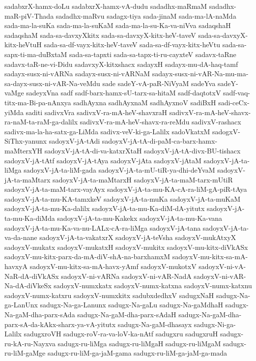 {sadabxrX-hamx-doLu
sadabxrX-hamx-vA-dudu
sadadhx-maRmaM
sadadhx-maR-piV-Thada
sadadhx-maRvu
sadagx-tiya
sada-jinaM
sada-ma-lA-naMda
sada-ma-la-suKa
sada-ma-la-suKaM
sada-ma-la-su-Ka-va-niVva
sadaqshaH
sadaqshaM
sada-sa-davxyXkitx
sada-sa-davxyX-kitx-heV-taveV
sada-sa-davxyX-kitx-heVtuH
sada-sa-df-vayx-kitx-heV-taveV
sada-sa-df-vayx-kitx-heVtu
sada-sa-sapx-ti-ma-duBxtaM
sada-sa-tapxti
sada-sa-tapx-ti-ru-cayxteV
sadavx-taRne
sadavx-taR-ne-vi-Didu
sadavxyX-kitxshacx
sadayxH
sadayx-mu-dA-haq-tamf
sadayx-susx-ni-vARNa
sadayx-susx-ni-vARNaM
sadayx-susx-ni-vAR-Na-mu-ma-sa-dayx-susx-ni-vAR-Na-veMdu
sade
sadeY-vA-paR-NiVyaM
sadeYva
sadeY-vaMge
sadeyxVna
sadf
sadf-barx-hamx-sU-tarx-sa-hitaM
sadf-daqtotxV
sadf-vaq-titx-ma-Bi-pa-nAnxya
sadhAyxna
sadhAyxnaM
sadhAyxnoV
sadiBxH
sadi-ceCx-yiMda
saditi
sadivxVra
sadivxV-ra-mA-heV-shavxraH
sadivxV-ra-mA-heV-shavx-ra-naM-ta-raM-ga-dalilx
sadivxV-ra-mA-heV-shavx-ra-reMdu
sadivxV-rashacx
sadivx-ma-la-ha-satx-ga-LiMda
sadivx-veV-ki-ga-Lalilx
sadoVkatxM
sadogxV-SiThx-yanunx
sadoyxV-jA-tAdi
sadoyxV-jA-tA-di-paM-ca-barx-hamx-maMterxYH
sadoyxV-jA-tA-di-va-katxrXtaH
sadoyxV-jA-tA-divx-BU-tishacx
sadoyxV-jA-tAtf
sadoyxV-jA-tAya
sadoyxV-jAta
sadoyxV-jAtaM
sadoyxV-jA-ta-liMga
sadoyxV-jA-ta-liM-gada
sadoyxV-jA-ta-mU-tiR-ya-dhi-deYvaM
sadoyxV-jA-ta-maMtarx
sadoyxV-jA-ta-maMtarxH
sadoyxV-jA-ta-maM-tarx-mUtiR
sadoyxV-jA-ta-maM-tarx-vayAyx
sadoyxV-jA-ta-mu-KA-cA-ra-liM-gA-piR-tAya
sadoyxV-jA-ta-mu-KA-tamxkeV
sadoyxV-jA-ta-muKa
sadoyxV-jA-ta-muKaM
sadoyxV-jA-ta-mu-Ka-dalilx
sadoyxV-jA-ta-mu-Ka-diM-dA-yitutx
sadoyxV-jA-ta-mu-Ka-diMda
sadoyxV-jA-ta-mu-Kakekx
sadoyxV-jA-ta-mu-Ka-vana
sadoyxV-jA-ta-mu-Ka-va-nu-LALx-cA-ra-liMga
sadoyxV-jA-tana
sadoyxV-jA-ta-va-da-nane
sadoyxV-jA-ta-vakatxrX
sadoyxV-jA-teVsha
sadoyxV-mukAtxyX
sadoyxV-mukatx
sadoyxV-mukatxH
sadoyxV-mukitx
sadoyxV-mu-kitx-diVkASx
sadoyxV-mu-kitx-parx-da-mA-diV-shA-na-barxhamxM
sadoyxV-mu-kitx-sa-mA-havxyA
sadoyxV-mu-kitx-sa-mA-havx-yAmf
sadoyxV-mukotxV
sadoyxV-ni-vA-NaR-dA-diVkASx
sadoyxV-ni-vARNa
sadoyxV-ni-vAR-NadA
sadoyxV-ni-vAR-Na-dA-diVkeSx
sadoyxV-numxkatx
sadoyxV-numx-katxna
sadoyxV-numx-katxnu
sadoyxV-numx-katxru
sadoyxV-numxkitx
sadubxdedhxV
sadugxNaH
sadugx-Na-ga-LanUnx
sadugx-Na-ga-Lanunx
sadugx-Na-gaLu
sadugx-Na-gaMdhaH
sadugx-Na-gaM-dha-parx-sAda
sadugx-Na-gaM-dha-parx-sAdaH
sadugx-Na-gaM-dha-parx-sA-da-kAkx-sharx-ya-vA-yitutx
sadugx-Na-gaM-dhasayx
sadugx-Ni-ga-Lalilx
sadugxroVH
sadugx-roV-ra-va-loV-ka-nAtf
sadugxru
sadugxruH
sadugx-ru-kA-ru-Nayxva
sadugx-ru-liMga
sadugx-ru-liMgaH
sadugx-ru-liMgaM
sadugx-ru-liM-gaMge
sadugx-ru-liM-ga-jaM-gama
sadugx-ru-liM-ga-jaM-ga-mada
}
